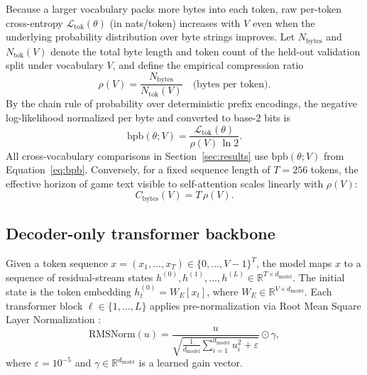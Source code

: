 \documentclass[11pt]{article}
\newcommand{\bpb}{\mathrm{bpb}}
\begin{document}
Because a larger vocabulary packs more bytes into each token, raw per-token cross-entropy $\mathcal{L}_{\mathrm{tok}}(\theta)$ (in nats/token) increases with $V$ even when the underlying probability distribution over byte strings improves. Let $N_{\mathrm{bytes}}$ and $N_{\mathrm{tok}}(V)$ denote the total byte length and token count of the held-out validation split under vocabulary $V$, and define the empirical compression ratio
\begin{equation}
\rho(V) = \frac{N_{\mathrm{bytes}}}{N_{\mathrm{tok}}(V)} \quad \text{(bytes per token)}.
\label{eq:bpt}
\end{equation}
By the chain rule of probability over deterministic prefix encodings, the negative log-likelihood normalized per byte and converted to base-$2$ bits is
\begin{equation}
\bpb(\theta; V) = \frac{\mathcal{L}_{\mathrm{tok}}(\theta)}{\rho(V)\,\ln 2}.
\label{eq:bpb}
\end{equation}
All cross-vocabulary comparisons in Section~\ref{sec:results} use $\bpb(\theta; V)$ from Equation~\eqref{eq:bpb}. Conversely, for a fixed sequence length of $T = 256$ tokens, the effective horizon of game text visible to self-attention scales linearly with $\rho(V)$:
\begin{equation}
C_{\mathrm{bytes}}(V) = T\,\rho(V).
\label{eq:cbytes}
\end{equation}

\subsection{Decoder-only transformer backbone}
\label{sec:transformer}

Given a token sequence $x = (x_1, \dots, x_T) \in \{0, \dots, V-1\}^T$, the model maps $x$ to a sequence of residual-stream states $h^{(0)}, h^{(1)}, \dots, h^{(L)} \in \mathbb{R}^{T \times d_{\mathrm{model}}}$. The initial state is the token embedding $h^{(0)}_t = W_E[x_t]$, where $W_E \in \mathbb{R}^{V \times d_{\mathrm{model}}}$. Each transformer block $\ell \in \{1, \dots, L\}$ applies pre-normalization via Root Mean Square Layer Normalization \citep{zhang2019rmsnorm}:
\begin{equation}
\mathrm{RMSNorm}(u) = \frac{u}{\sqrt{\frac{1}{d_{\mathrm{model}}}\sum_{i=1}^{d_{\mathrm{model}}} u_i^2 + \varepsilon}} \odot \gamma,
\label{eq:rmsnorm}
\end{equation}
where $\varepsilon = 10^{-5}$ and $\gamma \in \mathbb{R}^{d_{\mathrm{model}}}$ is a learned gain vector.
\end{document}
